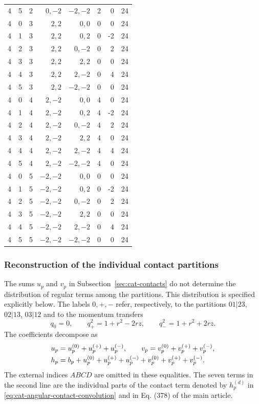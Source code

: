 \documentclass[11pt,a4paper]{article}
\begin{document}
\begin{longtable}{rrrrrrrr}
4 & 5 & 2 & $0,-2$ & $-2,-2$ & 2 & 0 & 24\\
4 & 0 & 3 & $2,2$ & $0,0$ & 0 & 0 & 24\\
4 & 1 & 3 & $2,2$ & $0,2$ & 0 & -2 & 24\\
4 & 2 & 3 & $2,2$ & $0,-2$ & 0 & 2 & 24\\
4 & 3 & 3 & $2,2$ & $2,2$ & 0 & 0 & 24\\
4 & 4 & 3 & $2,2$ & $2,-2$ & 0 & 4 & 24\\
4 & 5 & 3 & $2,2$ & $-2,-2$ & 0 & 0 & 24\\
4 & 0 & 4 & $2,-2$ & $0,0$ & 4 & 0 & 24\\
4 & 1 & 4 & $2,-2$ & $0,2$ & 4 & -2 & 24\\
4 & 2 & 4 & $2,-2$ & $0,-2$ & 4 & 2 & 24\\
4 & 3 & 4 & $2,-2$ & $2,2$ & 4 & 0 & 24\\
4 & 4 & 4 & $2,-2$ & $2,-2$ & 4 & 4 & 24\\
4 & 5 & 4 & $2,-2$ & $-2,-2$ & 4 & 0 & 24\\
4 & 0 & 5 & $-2,-2$ & $0,0$ & 0 & 0 & 24\\
4 & 1 & 5 & $-2,-2$ & $0,2$ & 0 & -2 & 24\\
4 & 2 & 5 & $-2,-2$ & $0,-2$ & 0 & 2 & 24\\
4 & 3 & 5 & $-2,-2$ & $2,2$ & 0 & 0 & 24\\
4 & 4 & 5 & $-2,-2$ & $2,-2$ & 0 & 4 & 24\\
4 & 5 & 5 & $-2,-2$ & $-2,-2$ & 0 & 0 & 24\\
\end{longtable}
\subsubsection{Reconstruction of the individual contact partitions}
\label{sec:cat-contact-partitions}
The sums $u_p$ and $v_p$ in Subsection~\ref{sec:cat-contacts} do not determine the distribution of regular terms among the partitions. This distribution is specified explicitly below. The labels $0,+,-$ refer, respectively, to the partitions $01|23$, $02|13$, $03|12$ and to the momentum transfers
\begin{equation}
 q_0=0,\qquad q_+^2=1+r^2-2rz,\qquad q_-^2=1+r^2+2rz.
\label{eq:cat-partition-transfers}
\end{equation}
The coefficients decompose as
\begin{equation}
\shortstack[l]{$\displaystyle u_p=u_p^{(0)}+u_p^{(+)}+u_p^{(-)},\qquad
 v_p=v_p^{(0)}+v_p^{(+)}+v_p^{(-)},$\\
$\displaystyle h_p=b_p+u_p^{(0)}+u_p^{(+)}+u_p^{(-)}
                   +v_p^{(0)}+v_p^{(+)}+v_p^{(-)}.$}
\label{eq:cat-partition-contact-sum}
\end{equation}
The external indices $ABCD$ are omitted in these equalities. The seven terms in the second line are the individual parts of the contact term denoted by $h_p^{(d)}$ in \eqref{eq:cat-angular-contact-convolution} and in Eq. (378) of the main article.
\end{document}
